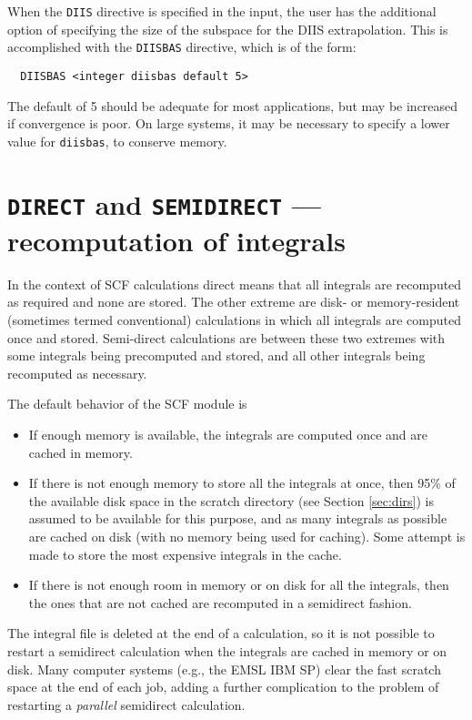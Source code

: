 When the \verb+DIIS+ directive is specified in the input, the user has
the additional option of specifying the size of the subspace for the
DIIS extrapolation.  This is accomplished with the \verb+DIISBAS+
directive, which is of the form:
\begin{verbatim}
  DIISBAS <integer diisbas default 5>
\end{verbatim}
The default of 5 should be adequate for most applications, but may be
increased if convergence is poor.  On large systems, it may be necessary
to specify a lower value for \verb+diisbas+, to conserve memory.

\section{{\tt DIRECT} and {\tt SEMIDIRECT} --- recomputation of integrals}
\label{sec:semidirect}

In the context of SCF calculations direct means that all integrals are
recomputed as required and none are stored.  The other extreme are
disk- or memory-resident (sometimes termed conventional) calculations
in which all integrals are computed once and stored.  Semi-direct
calculations are between these two extremes with some integrals being
precomputed and stored, and all other integrals being recomputed as
necessary.

The default behavior of the SCF module is
\begin{itemize}
\item If enough memory is available, the integrals are computed once
  and are cached in memory.
\item If there is not enough memory to store all the integrals at
  once, then 95\% of the available disk space in the scratch directory
  (see Section \ref{sec:dirs}) is assumed to be available for this
  purpose, and as many integrals as possible are cached on disk (with
  no memory being used for caching).  Some attempt is made to store
  the most expensive integrals in the cache.  
 \item If there is not enough room in memory or on disk for all the
   integrals, then the ones that are not cached are recomputed in a
   semidirect fashion.
\end{itemize}

The integral file is deleted at the end of a calculation, so it is not
possible to restart a semidirect calculation when the integrals are
cached in memory or on disk.  Many computer systems (e.g., the EMSL
IBM SP) clear the fast scratch space at the end of each job, adding a
further complication to the problem of restarting a {\em parallel}
semidirect calculation.

